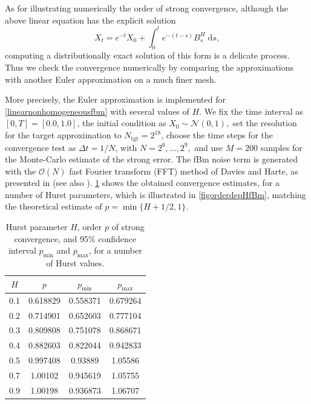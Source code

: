 \documentclass[reqno,12pt]{amsart}
\theoremstyle{plain} %
\theoremstyle{definition} %
\begin{document}
As for illustrating numerically the order of strong convergence, although the above linear equation has the explicit solution
\begin{equation}
    X_t = e^{-t}X_0 + \int_0^t e^{-(t-s)}B^H_s\;\mathrm{d}s,
\end{equation}
computing a distributionally exact solution of this form is a delicate process. Thus we check the convergence numerically by comparing the approximations with another Euler approximation on a much finer mesh.

More precisely, the Euler approximation is implemented for \eqref{linearnonhomogeneousfbm} with several values of $H$. We fix the time interval as $[0, T] = [0.0, 1.0]$, the initial condition as $X_0 \sim \mathcal{N}(0, 1),$ set the resolution for the target approximation to $N_{\textrm{tgt}} = 2^{18}$, choose the time steps for the convergence test as $\Delta t = 1/N$, with $N = 2^6, \ldots, 2^9,$ and use $M = 200$ samples for the Monte-Carlo estimate of the strong error. The fBm noise term is generated with the $\mathcal{O}(N)$ fast Fourier transform (FFT) method of Davies and Harte, as presented in \cite{DiekerMandjes2003} (see also \cite[Section 14.4]{HanKloeden2017}). \cref{taborderdepHfBm} shows the obtained convergence estimates, for a number of Hurst parameters, which is illustrated in \cref{figorderdepHfBm}, matching the theoretical estimate of $p = \min\{H+1/2, 1\}.$

\begin{table}
    \begin{tabular}[htb]{|c|c|c|c|}
        \hline $H$ & $p$ & $p_{\textrm{min}}$ & $p_{\textrm{max}}$ \\
        \hline \hline
        0.1 & 0.618829 & 0.558371 & 0.679264 \\
        0.2 & 0.714901 & 0.652603 & 0.777104 \\
        0.3 & 0.809808 & 0.751078 & 0.868671 \\
        0.4 & 0.882603 & 0.822044 & 0.942833 \\
        0.5 & 0.997408 & 0.93889 & 1.05586 \\
        0.7 & 1.00102 & 0.945619 & 1.05755 \\
        0.9 & 1.00198 & 0.936873 & 1.06707 \\
        \hline
    \end{tabular}
    \bigskip

    \caption{Hurst parameter $H$, order $p$ of strong convergence, and 95\% confidence interval $p_{\textrm{min}}$ and $p_{\textrm{max}}$, for a number of Hurst values.}
    \label{taborderdepHfBm}
\end{table}
\end{document}
